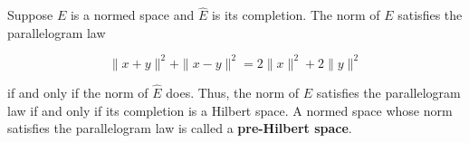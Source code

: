 Suppose $E$ is a normed space and $\hat{E}$ is its completion. The norm of $E$ satisfies the parallelogram law

$$\|x + y\|^2 + \|x - y\|^2 = 2\|x\|^2 + 2\|y\|^2$$

if and only if the norm of $\hat{E}$ does. Thus, the norm of $E$ satisfies the parallelogram law if and only if its completion is a Hilbert space. A normed space whose norm satisfies the parallelogram law is called a \textbf{pre-Hilbert space}.
